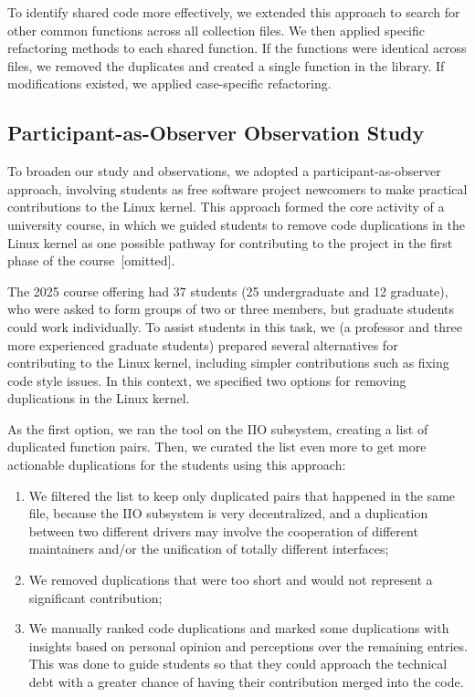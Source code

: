 \documentclass[10pt,conference]{IEEEtran}
\begin{document}
To identify shared code more effectively, we extended this approach to search for other common functions across all collection files. We then applied specific refactoring methods to each shared function. If the functions were identical across files, we removed the duplicates and created a single function in the library. If modifications existed, we applied case-specific refactoring.

\subsection{Participant-as-Observer Observation Study}

To broaden our study and observations, we adopted a participant-as-observer approach, involving students as free software project newcomers to make practical contributions to the Linux kernel. This approach formed the core activity of a university course, in which we guided students to remove code duplications in the Linux kernel as one possible pathway for contributing to the project in the first phase of the course~[omitted].

The 2025 course offering had 37 students (25 undergraduate and 12 graduate), who were asked to form groups of two or three members, but graduate students could work individually. To assist students in this task, we (a professor and three more experienced graduate students) prepared several alternatives for contributing to the Linux kernel, including simpler contributions such as fixing code style issues. In this context, we specified two options for removing duplications in the Linux kernel.

As the first option, we ran the tool on the IIO subsystem, creating a list of duplicated function pairs. Then, we curated the list even more to get more actionable duplications for the students using this approach:

\begin{enumerate}
    \item We filtered the list to keep only duplicated pairs that happened in the same file, because the IIO subsystem is very decentralized, and a duplication between two different drivers may involve the cooperation of different maintainers and/or the unification of totally different interfaces;
    \item We removed duplications that were too short and would not represent a significant contribution;
    \item We manually ranked code duplications and marked some duplications with insights based on personal opinion and perceptions over the remaining entries. This was done to guide students so that they could approach the technical debt with a greater chance of having their contribution merged into the code.
\end{enumerate}
\end{document}
